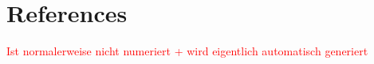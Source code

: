 \section{References}
\textcolor{red}{Ist normalerweise nicht numeriert + wird eigentlich automatisch generiert}